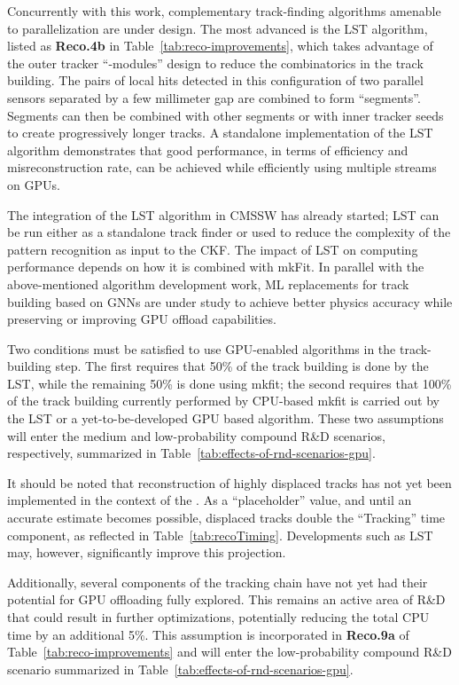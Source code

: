 Concurrently with this work, complementary track-finding algorithms amenable to parallelization are under design. The most advanced is the \gls{LST} algorithm, listed as \textbf{Reco.4b} in Table~\ref{tab:reco-improvements}, which takes advantage of the outer tracker ``\pt-modules'' design to reduce the combinatorics in the track building. The pairs of local hits detected in this configuration of two parallel sensors separated by a few millimeter gap are combined to form ``segments''.  Segments can then be combined with other segments or with inner tracker seeds to create progressively longer tracks. A standalone implementation of the \gls{LST} algorithm demonstrates that good performance, in terms of efficiency and misreconstruction rate, can be achieved while efficiently using multiple streams on \glspl{GPU}. 

The integration of the \gls{LST} algorithm in \gls{CMSSW} has already started; \gls{LST} can be run either as a standalone track finder or used to reduce the complexity of the pattern recognition as input to the \gls{CKF}. The impact of \gls{LST} on computing performance depends on how it is combined with mkFit. In parallel with the above-mentioned algorithm development work, ML replacements for track building based on \glspl{GNN} are under study to achieve better physics accuracy while preserving or improving \gls{GPU} offload capabilities.

Two conditions must be satisfied to use \gls{GPU}-enabled algorithms in the track-building step. The first requires that 50\% of the track building is done by the \gls{LST}, while the remaining 50\% is done using mkfit; the second requires that 100\% of the track building currently performed by \gls{CPU}-based mkfit is carried out by the \gls{LST} or a yet-to-be-developed \gls{GPU} based algorithm. These two assumptions will enter the medium and low-probability compound R\&D scenarios, respectively, summarized in Table~\ref{tab:effects-of-rnd-scenarios-gpu}.

It should be noted that reconstruction of highly displaced tracks has not yet been implemented in the context of the \PhaseTwo.  As a ``placeholder'' value, and until an accurate estimate becomes possible, displaced tracks double the ``Tracking'' time component, as reflected in Table~\ref{tab:recoTiming}. Developments such as \gls{LST} may, however, significantly improve this projection. 

Additionally, several components of the tracking chain have not yet had their potential for \gls{GPU} offloading fully explored. This remains an active area of R\&D that could result in further optimizations, potentially reducing the total \gls{CPU} time by an additional 5\%. This assumption is incorporated in \textbf{Reco.9a} of Table~\ref{tab:reco-improvements} and will enter the low-probability compound R\&D scenario summarized in Table~\ref{tab:effects-of-rnd-scenarios-gpu}.

